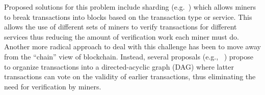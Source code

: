 Proposed solutions for this problem include sharding (e.g.~\cite{CCS:LNZBGS16, FC:GenRenSir17}) which allows miners to break transactions into blocks based on the transaction type or service.  This allows the use of different sets of miners to verify transactions for different services thus reducing the amount of verification work each miner must do.  Another more radical approach to deal with this challenge has been to move away from the ``chain'' view of blockchain.  Instead, several proposals (e.g., ~\cite{ePrint:SomLewZoh16,eprint:SomZoh18,IOTA}) propose to organize transactions into a directed-acyclic graph (DAG) where latter transactions can vote on the validity of earlier transactions, thus eliminating the need for verification by miners.
%
%



